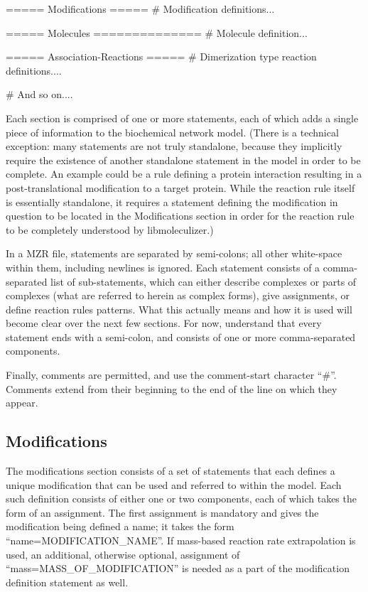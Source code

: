 \begin{ExampleMZR}[title={the caption}, caption={a caption}]
===== Modifications =====
  # Modification definitions...

===== Molecules ==============
  # Molecule definition...

=====  Association-Reactions =====
  # Dimerization type reaction definitions....

# And so on....
\end{ExampleMZR}
 
Each section is comprised of one or more statements, each of which
adds a single piece of information to the biochemical network
model. (There is a technical exception: many statements are not truly
standalone, because they implicitly require the existence of another
standalone statement in the model in order to be complete.  An example
could be a rule defining a protein interaction resulting in a
post-translational modification to a target protein.  While the
reaction rule itself is essentially standalone, it requires a
statement defining the modification in question to be located in the
Modifications section in order for the reaction rule to be completely
understood by libmoleculizer.)

In a MZR file, statements are separated by semi-colons; all other
white-space within them, including newlines is ignored.  Each statement
consists of a comma-separated list of sub-statements, which can either
describe complexes or parts of complexes (what are referred to herein
as complex forms), give assignments, or define reaction rules
patterns.  What this actually means and how it is used will
become clear over the next few sections.  For now, understand that
every statement ends with a semi-colon, and consists of one or more
comma-separated components.

Finally, comments are permitted, and use the comment-start character
``\#''.  Comments extend from their beginning to the end of the line on
which they appear.

\subsection{Modifications}
The modifications section consists of a set of statements that each
defines a unique modification that can be used and referred to within
the model.  Each such definition consists of either one or two
components, each of which takes the form of an assignment.  The first
assignment is mandatory and gives the modification being defined a
name; it takes the form ``name=MODIFICATION\_NAME''.  If mass-based
reaction rate extrapolation is used, an additional, otherwise
optional, assignment of ``mass=MASS\_OF\_MODIFICATION'' is needed as a
part of the modification definition statement as well.

